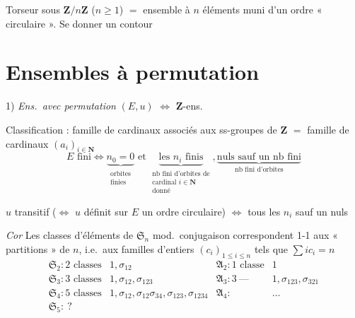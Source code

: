 \documentclass[11pt,a4paper]{article}
\begin{document}

Torseur sous $\mathbf{Z}/n\mathbf{Z}$ ($n \geq 1$) $=$ ensemble à $n$
éléments muni d'un ordre « circulaire ». Se donner un contour

\section*{Ensembles à permutation}


1) \emph{Ens.\ avec permutation} $(E, u)$ $\Leftrightarrow$
$\mathbf{Z}$-ens.

Classification : famille de cardinaux associés aux ss-groupes de $\mathbf{Z}$
$=$ famille de cardinaux $(a_i)_{i \in \mathbf{N}}$
\[
  E \text{ fini} \Longleftrightarrow
  \underbrace{n_0 = 0}_{\substack{\text{orbites} \\ \text{finies}}}
  \text{ et }
  \underbrace{\text{les } n_i \text{ finis}}_{\substack{\text{nb fini d'orbites de} \\ \text{cardinal } i \in \mathbf{N} \\ \text{donné}}},
  \underbrace{\text{nuls sauf un nb fini}}_{\text{nb fini d'orbites}}
\]

$u$ transitif ($\Leftrightarrow$ $u$ définit sur $E$ un ordre circulaire)
$\Leftrightarrow$ tous les $n_i$ sauf un  nuls

\emph{Cor} Les classes d'éléments de $\mathfrak{S}_n$ mod.\ conjugaison
correspondent 1-1 aux « partitions » de $n$, i.e.\ aux familles d'entiers
$(c_i)_{1 \leq i \leq n}$ tels que $\sum i c_i = n$
\[
  \begin{array}{ll|ll}
    \mathfrak{S}_2 : 2 \text{ classes} & 1, \sigma_{12} &
      \mathfrak{A}_2 : 1 \text{ classe} & 1 \\
    \mathfrak{S}_3 : 3 \text{ classes} & 1, \sigma_{12}, \sigma_{123} &
      \mathfrak{A}_3 : 3\ \text{—} & 1, \sigma_{123}, \sigma_{321} \\
    \mathfrak{S}_4 : 5 \text{ classes} & 1, \sigma_{12}, \sigma_{12}\sigma_{34}, \sigma_{123}, \sigma_{1234} &
      \mathfrak{A}_4 : & \ldots \\
    \mathfrak{S}_5 : \ ? & & &
  \end{array}
\]
\end{document}
